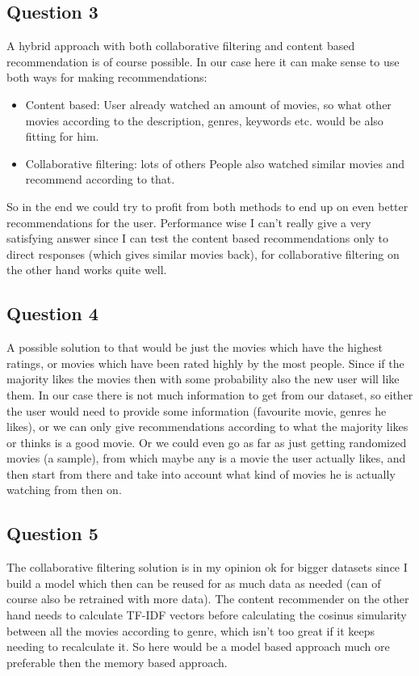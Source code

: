 \documentclass[11pt,a4paper]{article}
\begin{document}
\subsection{Question 3}
A hybrid approach with both collaborative filtering and content based recommendation is of course possible.
In our case here it can make sense to use both ways for making recommendations:
\begin{itemize}
	\item Content based: User already watched an amount of movies, so what other movies according to the description, genres, keywords etc. would be also fitting for him.
	\item Collaborative filtering: lots of others People also watched similar movies and recommend according to that.
\end{itemize}
So in the end we could try to profit from both methods to end up on even better recommendations for the user.
Performance wise I can't really give a very satisfying answer since I can test the content based recommendations only to direct responses (which gives similar movies back), for collaborative filtering on the other hand works quite well.

\subsection{Question 4}
A possible solution to that would be just the movies which have the highest ratings, or movies which have been rated highly by the most people.
Since if the majority likes the movies then with some probability also the new user will like them.
In our case there is not much information to get from our dataset, so either the user would need to provide some information (favourite movie, genres he likes), or we can only give recommendations according to what the majority likes or thinks is a good movie.
Or we could even go as far as just getting randomized movies (a sample), from which maybe any is a movie the user actually likes, and then start from there and take into account what kind of movies he is actually watching from then on.

\subsection{Question 5}

The collaborative filtering solution is in my opinion ok for bigger datasets since I build a model which then can be reused for as much data as needed (can of course also be retrained with more data).
The content recommender on the other hand needs to calculate TF-IDF vectors before calculating the cosinus simularity between all the movies according to genre, which isn't too great if it keeps needing to recalculate it.
So here would be a model based approach much ore preferable then the memory based approach.
\end{document}

